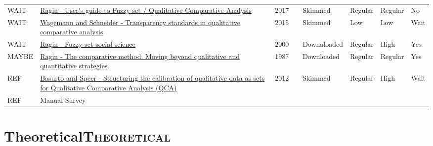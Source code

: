 \documentclass[11pt]{article}
\begin{document}
\begin{center}
\begin{tabular}{llrlllll}
WAIT & \href{http://www.socsci.uci.edu/\~cragin/fsQCA/software.shtml}{Ragin - User's guide to Fuzzy-set / Qualitative Comparative Analysis} & 2017 &  & Skimmed & Regular & Regular & No\\
WAIT & \href{https://doi.org/10.5281/zenodo.893091}{Wagemann and Schneider - Transparency standards in qualitative comparative analysis} & 2015 &  & Skimmed & Low & Low & Wait\\
WAIT & \href{https://press.uchicago.edu/ucp/books/book/chicago/F/bo3635786.html}{Ragin - Fuzzy-set social science} & 2000 &  & Downaloaded & Regular & High & Yes\\
MAYBE & \href{https://www.amazon.com.br/Comparative-Method-Qualitative-Quantitative-Strategies/dp/0520280032}{Ragin - The comparative method. Moving beyond qualitative and quantitative strategies} & 1987 &  & Downloaded & Regular & Regular & Yes\\
REF & \href{https://doi.org/10.1177/1525822X11433998}{Basurto and Speer - Structuring the calibration of qualitative data as sets for Qualitative Comparative Analysis (QCA)} & 2012 &  & Skimmed & Regular & High & Wait\\
REF & Manual Survey &  &  &  &  &  & \\
\end{tabular}
\end{center}


\section*{Theoretical\hfill{}\textsc{Theoretical}}
\label{sec:org142be37}
\end{document}
